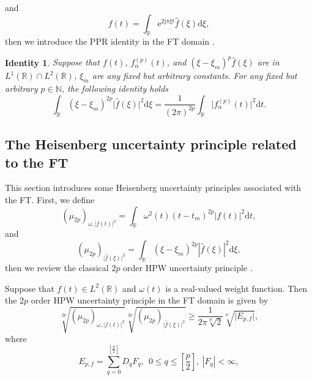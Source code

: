 \documentclass[preprint,12pt]{elsarticle}
\newtheorem{id}{Identity}
\begin{document}
and
\begin{equation}
\label{4}
f(t) = \int_{\mathbb{R}} \mathrm{e}^{2 \mathrm{j} \pi \xi t} \hat{f}(\xi) \mathrm{d}\xi,
\end{equation}
then we introduce the PPR identity in the FT domain \cite{HPW}.
\begin{id}
	Suppose that $f(t)$, $f_{\alpha}^{(p)}(t)$, and $(\xi-\xi_m)^p\hat{f}(\xi)$ are in $L^1(\mathbb{R}) \cap L^2(\mathbb{R})$, $\xi_m$ are any fixed but arbitrary constants. For any fixed but arbitrary $p \in \mathbb{N}$, the following identity holds
	\begin{equation}
	\label{5}
	\int_{\mathbb{R}}(\xi-\xi_m)^{2p} \lvert \hat{f}(\xi) \rvert ^2 \mathrm{d}\xi = \frac{1}{(2\pi )^{2p}} \int_{\mathbb{R}} \lvert f_{\alpha}^{(p)}(t) \rvert^2 \mathrm{d}t.
	\end{equation}
\end{id}

\subsection{The Heisenberg uncertainty principle related to the FT} 
This section introduces some Heisenberg uncertainty principles associated with the FT. First, we define
\begin{equation}
\label{51}
(\mu_{2p})_{\omega,\lvert f(t) \rvert^2} = \int_{\mathbb{R}} \omega^2(t) (t-t_m)^{2p} \left|f(t) \right|^2 \mathrm{d}t,
\end{equation}
and
\begin{equation}
\label{52}
(\mu_{2p})_{\lvert \hat{f}(\xi) \rvert ^2} = \int_{\mathbb{R}} (\xi-\xi_m)^{2p} \left| \hat{f}(\xi) \right| ^2 \mathrm{d} \xi,
\end{equation}
then we review the classical $2p$ order HPW uncertainty principle \cite{HPW}.

Suppose that $f(t) \in L^2(\mathbb{R})$ and $\omega(t)$ is a real-valued weight function. Then the $2p$ order HPW uncertainty principle in the FT domain is given by 
\begin{equation}
\label{2.2.1}
\sqrt[2p]{(\mu_{2p})_{\omega,\lvert f(t) \rvert^2}}  \sqrt[2p]{(\mu_{2p})_{\lvert \hat{f} (\xi) \rvert ^2}} \ge \frac{1}{2\pi\sqrt[p]{2}} \sqrt[p]{ \lvert E_{p,f} \rvert},
\end{equation}
where
\begin{equation}
\label{75}
E_{p,f} = \sum_{q=0}^{\left[ \frac{p}{2} \right]} D_q F_q, \ \ 0 \leq q \leq \left[ \frac{p}{2} \right], \ \left| F_q \right| < \infty,
\end{equation}
\end{document}
